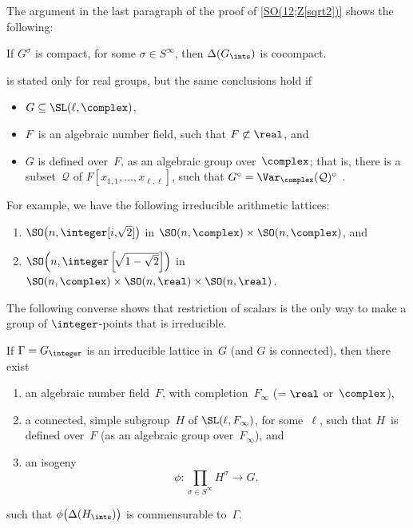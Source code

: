 The argument in the last paragraph of the proof of
\cref{SO(12;Z[sqrt2])} shows the following:

\begin{cor} \label{scalars->cpct}
 If $G^\sigma$ is compact, for some $\sigma \in S^\infty$,
then $\Delta(G_{\ints})$ is cocompact.
 \end{cor}

\begin{rem} \label{ResScal(FnotinR)}
  is stated only for real
groups, but the same conclusions hold if
\noprelistbreak
 \begin{itemize}
 \item $G \subseteq \SL(\ell,\complex)$, 
 \item $F$~is an algebraic number field, such that $F \not
\subset \real$, and
 \item $G$ is defined over~$F$, as an algebraic
group over~$\complex$; that is, there is  a
subset~$\mathcal{Q}$ of $F[x_{1,1},\ldots,x_{\ell,\ell}]$,
such that $G^\circ = \Var_{\complex}(\mathcal{Q})^\circ$  .
 \end{itemize}
 For example, we have the following irreducible arithmetic lattices:
 \begin{enumerate}
 \item $\SO \bigl( n, \integer [ i, \!\sqrt{2} ]
\bigr)$ 
in
$\SO(n,\complex) \times \SO(n,\complex)$, and
 \item
  $\SO \! \left( n, \integer \left[ \! \sqrt{1 - \sqrt{2}} \right]
\right)$ in
$\SO(n,\complex) \times \SO(n,\real) \times \SO(n,\real)$.
 \end{enumerate}
 \end{rem}

The following converse shows that restriction of scalars is
the only way to make a group of $\integer$-points that is irreducible.

\begin{prop} \label{GZirred->scalars}
 If\/ $\Gamma = G_{\integer}$ is an irreducible lattice
in~$G$ \textup(and $G$ is connected\/\textup), then there exist
\noprelistbreak
 \begin{enumerate}
 \item an algebraic number field~$F$, with
completion~$F_\infty$ \textup($= \real$
or\/~$\complex$\textup),
 \item a connected, simple subgroup~$H$ of\/
$\SL(\ell,F_{\infty})$, for some~$\ell$,  such that $H$~is
defined over~$F$ \textup(as an algebraic
group over~$F_{\infty}$\textup), and
 \item an isogeny
 $$\phi \colon \prod_{\sigma \in S^\infty} H^\sigma \to G ,$$
 \end{enumerate}
 such that 
 $\phi \bigl( \Delta(H_{\ints}) \bigr)$
 is commensurable to~$\Gamma$.
 \end{prop}

